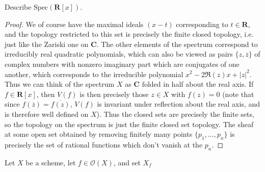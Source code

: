 \begin{theorem}
    Describe $\text{Spec}(\mathbf{R}[x])$.
\end{theorem}
\begin{proof}
    We of course have the maximal ideals $(x - t)$ corresponding to $t \in \mathbf{R}$, and the topology restricted to this set is precisely the finite closed topology, i.e. just like the Zariski one on $\mathbf{C}$. The other elements of the spectrum correspond to irreducibly real quadratic polynomials, which can also be viewed as pairs $\{ z, \overline{z} \}$ of complex numbers with nonzero imaginary part which are conjugates of one another, which corresponds to the irreducible polynomial $x^2 - 2\Re(z)x + |z|^2$. Thus we can think of the spectrum $X$ as $\mathbf{C}$ folded in half about the real axis. If $f \in \mathbf{R}[x]$, then $V(f)$ is then precisely those $z \in X$ with $f(z) = 0$ (note that since $f(\overline{z}) = \overline{f(z)}$, $V(f)$ is invariant under reflection about the real axis, and is therefore well defined on $X$). Thus the closed sets are precisely the finite sets, so the topology on the spectrum is just the finite closed set topology. The sheaf at some open set obtained by removing finitely many points $\{ p_1, \dots, p_n \}$ is precisely the set of rational functions which don't vanish at the $p_n$.
\end{proof}

\begin{theorem}
    Let $X$ be a scheme, let $f \in \mathcal{O}(X)$, and set $X_f$
\end{theorem}



